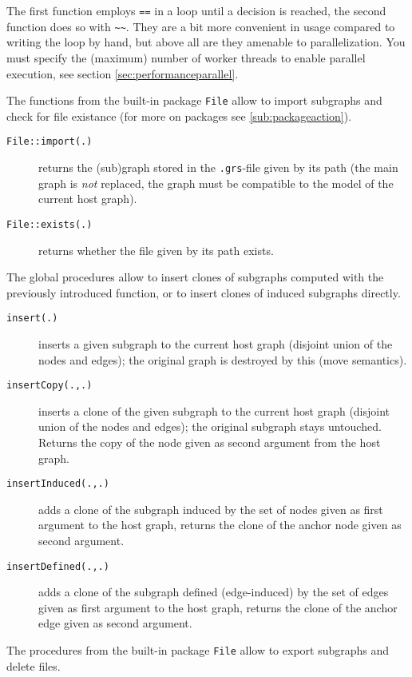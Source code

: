 The first function employs \verb#==# in a loop until a decision is reached, the second function does so with \verb#~~#.
They are a bit more convenient in usage compared to writing the loop by hand, but above all are they amenable to parallelization.
You must specify the (maximum) number of worker threads to enable parallel execution, see section \ref{sec:performanceparallel}.
 
The functions from the built-in package \texttt{File} allow to import subgraphs and check for file existance (for more on packages see \ref{sub:packageaction}).

\begin{description}
\item[\texttt{File::import(.)}] returns the (sub)graph stored in the \texttt{.grs}-file given by its path (the main graph is \emph{not} replaced, the graph must be compatible to the model of the current host graph).
\item[\texttt{File::exists(.)}] returns whether the file given by its path exists.
\end{description}

The global procedures allow to insert clones of subgraphs computed with the previously introduced function,
or to insert clones of induced subgraphs directly.

\begin{description}
\item[\texttt{insert(.)}] inserts a given subgraph to the current host graph (disjoint union of the nodes and edges); the original graph is destroyed by this (move semantics).
\item[\texttt{insertCopy(.,.)}] inserts a clone of the given subgraph to the current host graph (disjoint union of the nodes and edges); the original subgraph stays untouched. Returns the copy of the node given as second argument from the host graph.
\item[\texttt{insertInduced(.,.)}] adds a clone of the subgraph induced by the set of nodes given as first argument to the host graph, returns the clone of the anchor node given as second argument.
\item[\texttt{insertDefined(.,.)}] adds a clone of the subgraph defined (edge-induced) by the set of edges given as first argument to the host graph, returns the clone of the anchor edge given as second argument.
\end{description}

The procedures from the built-in package \texttt{File} allow to export subgraphs and delete files.

